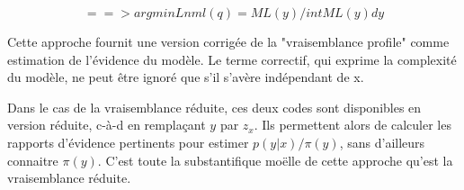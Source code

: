 \documentclass{article}
\begin{document}
$$==> argmin Lnml(q) = ML(y) / int ML(y) dy$$ 

Cette approche fournit une version corrig\'ee de la "vraisemblance profile" comme estimation de l'\'evidence du mod\`ele. Le terme correctif, qui exprime la complexit\'e du mod\`ele, ne peut \^etre ignor\'e que s'il s'av\`ere ind\'ependant de x. 

Dans le cas de la vraisemblance r\'eduite, ces deux codes sont disponibles en version r\'eduite, c-\`a-d en rempla\c{c}ant $y$ par $z_x$. Ils permettent alors de calculer les rapports d'\'evidence pertinents pour estimer $p(y|x)/\pi(y)$, sans d'ailleurs connaitre $\pi(y)$. C'est toute la substantifique mo\"elle de cette approche qu'est la vraisemblance r\'eduite. 
\end{document}
